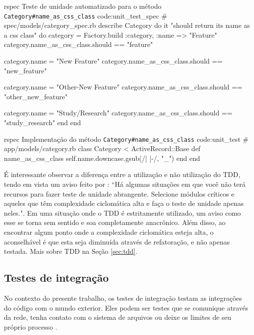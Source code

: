 \begin{mycode}{rspec}%
{Teste de unidade automatizado para o método \texttt{Category\#name\_as\_css\_class} }{code:unit_test_spec}
# spec/models/category_spec.rb
describe Category do
  it "should return its name as a css class" do
    category = Factory.build :category, :name => "Feature"
    category.name_as_css_class.should == "feature"

    category.name = "New Feature"
    category.name_as_css_class.should == "new_feature"

    category.name = "Other-New Feature"
    category.name_as_css_class.should == "other_new_feature"

    category.name = "Study/Research"
    category.name_as_css_class.should == "study_research"
  end
end
\end{mycode}

\begin{mycode}{rspec}%
{Implementação do método \texttt{Category\#name\_as\_css\_class} }{code:unit_test}
# app/models/category.rb
class Category < ActiveRecord::Base
  def name_as_css_class
    self.name.downcase.gsub(/\/| |-/, "_")
  end
end
\end{mycode}

É interessante observar a diferença entre a utilização e não utilização do TDD, tendo em vista um aviso feito por : ``Há algumas situações em que você não terá recursos para fazer teste de unidade abrangente. Selecione módulos críticos e aqueles que têm complexidade ciclomática alta e faça o teste de unidade apenas neles.". Em uma situação onde o TDD é estritamente utilizado, um aviso como esse se torna sem sentido e soa completamente anacrônico. Além disso, ao encontrar algum ponto onde a complexidade ciclomática esteja alta, o aconselhável é que esta seja diminuída através de refatoração, e não apenas testada. Mais sobre TDD na Seção \ref{sec:tdd}.


\subsection{Testes de integração}
\label{sub:testes_de_integracao}

No contexto do presente trabalho, os testes de integração testam as integrações do código com o mundo exterior. Eles podem ser testes que se comunique através da rede, tenha contato com o sistema de arquivos ou deixe os limites de seu próprio processo \cite{ArtOfAgileDevelopment}.

